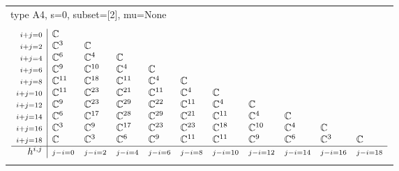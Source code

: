 \documentclass[crop,border=2mm]{standalone}
\begin{document}
\begin{tabular}{l}
{\huge type A4, s=0, subset=[2], mu=None}\\ \\


$\displaystyle
\begin{array}{r|l l l l l l l l l l}
	{\scriptstyle i+j=0}&\mathbb{C}&&&&&&&&&\\
	{\scriptstyle i+j=2}&\mathbb{C}^{3}&\mathbb{C}&&&&&&&&\\
	{\scriptstyle i+j=4}&\mathbb{C}^{6}&\mathbb{C}^{4}&\mathbb{C}&&&&&&&\\
	{\scriptstyle i+j=6}&\mathbb{C}^{9}&\mathbb{C}^{10}&\mathbb{C}^{4}&\mathbb{C}&&&&&&\\
	{\scriptstyle i+j=8}&\mathbb{C}^{11}&\mathbb{C}^{18}&\mathbb{C}^{11}&\mathbb{C}^{4}&\mathbb{C}&&&&&\\
	{\scriptstyle i+j=10}&\mathbb{C}^{11}&\mathbb{C}^{23}&\mathbb{C}^{21}&\mathbb{C}^{11}&\mathbb{C}^{4}&\mathbb{C}&&&&\\
	{\scriptstyle i+j=12}&\mathbb{C}^{9}&\mathbb{C}^{23}&\mathbb{C}^{29}&\mathbb{C}^{22}&\mathbb{C}^{11}&\mathbb{C}^{4}&\mathbb{C}&&&\\
	{\scriptstyle i+j=14}&\mathbb{C}^{6}&\mathbb{C}^{17}&\mathbb{C}^{28}&\mathbb{C}^{29}&\mathbb{C}^{21}&\mathbb{C}^{11}&\mathbb{C}^{4}&\mathbb{C}&&\\
	{\scriptstyle i+j=16}&\mathbb{C}^{3}&\mathbb{C}^{9}&\mathbb{C}^{17}&\mathbb{C}^{23}&\mathbb{C}^{23}&\mathbb{C}^{18}&\mathbb{C}^{10}&\mathbb{C}^{4}&\mathbb{C}&\\
	{\scriptstyle i+j=18}&\mathbb{C}&\mathbb{C}^{3}&\mathbb{C}^{6}&\mathbb{C}^{9}&\mathbb{C}^{11}&\mathbb{C}^{11}&\mathbb{C}^{9}&\mathbb{C}^{6}&\mathbb{C}^{3}&\mathbb{C}\\
	\hline h^{i,j}&{\scriptstyle j-i=0}&{\scriptstyle j-i=2}&{\scriptstyle j-i=4}&{\scriptstyle j-i=6}&{\scriptstyle j-i=8}&{\scriptstyle j-i=10}&{\scriptstyle j-i=12}&{\scriptstyle j-i=14}&{\scriptstyle j-i=16}&{\scriptstyle j-i=18}
\end{array}
$ \\ \\



\end{tabular}
\end{document}
